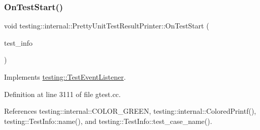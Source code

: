 \subsubsection{\texorpdfstring{On\+Test\+Start()}{OnTestStart()}}
{\footnotesize\ttfamily void testing\+::internal\+::\+Pretty\+Unit\+Test\+Result\+Printer\+::\+On\+Test\+Start (\begin{DoxyParamCaption}\item[{const \hyperlink{classtesting_1_1TestInfo}{Test\+Info} \&}]{test\+\_\+info }\end{DoxyParamCaption})\hspace{0.3cm}{\ttfamily [virtual]}}



Implements \hyperlink{classtesting_1_1TestEventListener_ab4f6a0ca16ae75daf385b3b5914e1048}{testing\+::\+Test\+Event\+Listener}.



Definition at line 3111 of file gtest.\+cc.



References testing\+::internal\+::\+C\+O\+L\+O\+R\+\_\+\+G\+R\+E\+EN, testing\+::internal\+::\+Colored\+Printf(), testing\+::\+Test\+Info\+::name(), and testing\+::\+Test\+Info\+::test\+\_\+case\+\_\+name().


